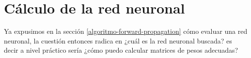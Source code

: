%
%

\chapter{Cálculo de la red neuronal}

Ya expusimos en la sección \ref{algoritmo-forward-propagation} cómo evaluar
una red neuronal, la cuestión entonces radica en ¿cuál es la red neuronal
buscada? es decir a nivel práctico sería ¿cómo puedo calcular matrices de pesos 
adecuadas?
